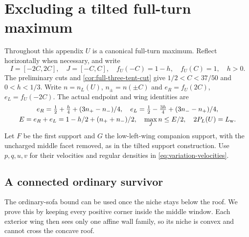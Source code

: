 \section{Excluding a tilted full-turn maximum}\label{app:tilted-selector}

Throughout this appendix $U$ is a canonical full-turn maximum.
Reflect horizontally when necessary, and write
\[
 I=[-2C,2C],\quad J=[-C,C],\quad
 f_U(-C)=1-h,\quad f_U(C)=1,\quad h>0.
\]
The preliminary cuts and \cref{cor:full-three-tent-cut} give
$1/2<C<37/50$ and $0<h<1/3$.
Write $n=n_L(U)$, $n_\pm=n(\pm C)$ and $e_R=f_U(2C)$,
$e_L=f_U(-2C)$. The actual endpoint and wing identities are
\begin{equation}\label{eq:tilted-endpoints}
 \begin{gathered}
 e_R=\tfrac12+\tfrac h4+(3n_+-n_-)/4,\quad
 e_L=\tfrac12-\tfrac{3h}4+(3n_--n_+)/4,\\
 E=e_R+e_L=1-h/2+(n_++n_-)/2,\quad
 \max_Jn\le E/2,\quad 2P_L(U)=L_{\rm w}.
 \end{gathered}
\end{equation}
Let $F$ be the first support and $G$ the low-left-wing companion
support, with the uncharged middle facet removed, as in the tilted
support construction. Use $p,q,u,v$ for their velocities and regular
densities in \eqref{eq:variation-velocities}.

\subsection{A connected ordinary survivor}

The ordinary-sofa bound can be used once the niche stays below the
roof. We prove this by keeping every positive corner inside the
middle window. Each exterior wing then sees only one affine wall
family, so its niche is convex and cannot cross the concave roof.

